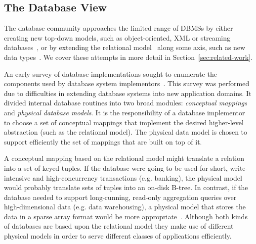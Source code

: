 \documentclass[letterpaper,twocolumn,10pt]{article}
\newcommand{\eab}[1]{\textcolor{red}{\bf EAB: #1}}
\begin{document}
\subsection{The Database View}

The database community approaches the limited range of DBMSs by either
creating new top-down models, such as object-oriented, XML or streaming databases~\cite{streaming, objectstore, XMLdb},
or by extending the relational model~\cite{codd} along some axis, such
as new data types~\cite{newDBtypes}.  We cover these attempts in more detail in
Section~\ref{sec:related-work}.


An early survey of database implementations sought to enumerate the
components used by database system implementors~\cite{batoryConceptual,batoryPhysical}.  This
survey was performed due to difficulties in extending database systems
into new application domains.  It divided internal database
routines into two broad modules: {\em conceptual mappings} and {\em physical
database models}.
It is the responsibility of a database implementor to choose a set of
conceptual mappings that implement the desired higher-level
abstraction (such as the relational model).  The physical data model
is chosen to support efficiently the set of mappings that are built on
top of it.

A conceptual mapping based on the relational model might translate a
relation into a set of keyed tuples.  If the database were going to be
used for short, write-intensive and high-concurrency transactions
(e.g. banking), the physical model would probably translate sets of tuples
into an on-disk B-tree.  In contrast, if the database needed to
support long-running, read-only aggregation queries over high-dimensional data (e.g. data warehousing), a physical model that stores the data in a sparse
array format would be more appropriate~\cite{OLAP,molap}.  Although both
kinds of databases are based upon the relational model they make
use of different physical models in order to serve
different classes of applications efficiently.  
\end{document}

